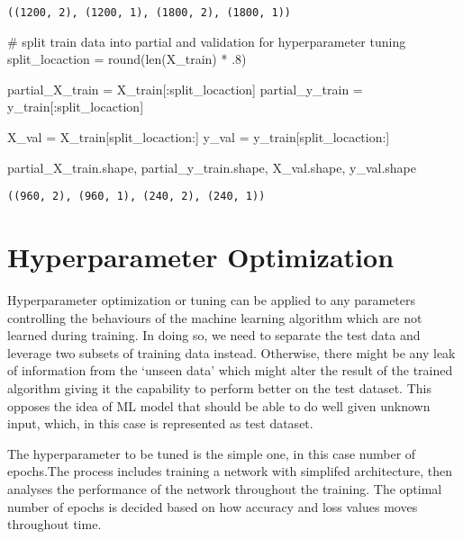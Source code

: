 \documentclass[
  letterpaper,
  DIV=11,
  numbers=noendperiod]{scrreprt}
\newenvironment{Shaded}{\begin{snugshade}}{\end{snugshade}}
\newcommand{\BuiltInTok}[1]{\textcolor[rgb]{0.00,0.23,0.31}{#1}}
\newcommand{\CommentTok}[1]{\textcolor[rgb]{0.37,0.37,0.37}{#1}}
\newcommand{\FloatTok}[1]{\textcolor[rgb]{0.68,0.00,0.00}{#1}}
\newcommand{\NormalTok}[1]{\textcolor[rgb]{0.00,0.23,0.31}{#1}}
\newcommand{\OperatorTok}[1]{\textcolor[rgb]{0.37,0.37,0.37}{#1}}
\begin{document}
\begin{verbatim}
((1200, 2), (1200, 1), (1800, 2), (1800, 1))
\end{verbatim}

\begin{Shaded}
\begin{Highlighting}[]
\CommentTok{\# split train data into \textasciigrave{}partial\textasciigrave{} and \textasciigrave{}validation\textasciigrave{} for hyperparameter tuning}
\NormalTok{split\_locaction }\OperatorTok{=} \BuiltInTok{round}\NormalTok{(}\BuiltInTok{len}\NormalTok{(X\_train) }\OperatorTok{*} \FloatTok{.8}\NormalTok{)}

\NormalTok{partial\_X\_train }\OperatorTok{=}\NormalTok{ X\_train[:split\_locaction]}
\NormalTok{partial\_y\_train }\OperatorTok{=}\NormalTok{ y\_train[:split\_locaction]}

\NormalTok{X\_val }\OperatorTok{=}\NormalTok{ X\_train[split\_locaction:]}
\NormalTok{y\_val }\OperatorTok{=}\NormalTok{ y\_train[split\_locaction:]}

\NormalTok{partial\_X\_train.shape, partial\_y\_train.shape, X\_val.shape, y\_val.shape}
\end{Highlighting}
\end{Shaded}

\begin{verbatim}
((960, 2), (960, 1), (240, 2), (240, 1))
\end{verbatim}

\hypertarget{hyperparameter-optimization}{%
\section{Hyperparameter
Optimization}\label{hyperparameter-optimization}}

Hyperparameter optimization or tuning can be applied to any parameters
controlling the behaviours of the machine learning algorithm which are
not learned during training. In doing so, we need to separate the test
data and leverage two subsets of training data instead. Otherwise, there
might be any leak of information from the `unseen data' which might
alter the result of the trained algorithm giving it the capability to
perform better on the test dataset. This opposes the idea of ML model
that should be able to do well given unknown input, which, in this case
is represented as test dataset.

The hyperparameter to be tuned is the simple one, in this case number of
epochs.The process includes training a network with simplifed
architecture, then analyses the performance of the network throughout
the training. The optimal number of epochs is decided based on how
accuracy and loss values moves throughout time.
\end{document}
